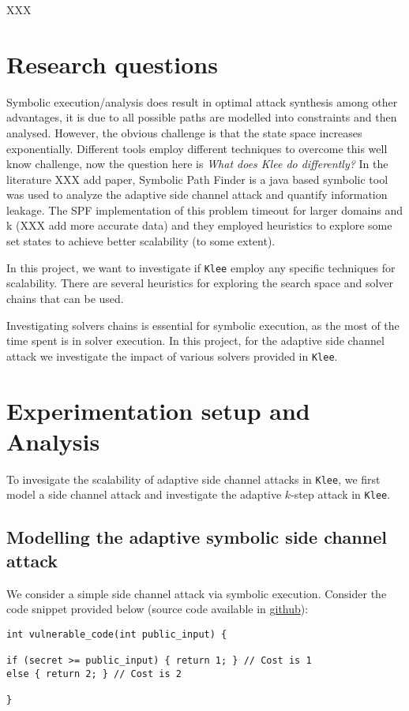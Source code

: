 \documentclass[11pt,a4paper,notitlepage]{article}
\begin{document}
XXX

\newpage

\section{Research questions}
\label{sec:researchquestions}

Symbolic execution/analysis does result in optimal attack synthesis among other advantages, it is due to all possible paths are modelled into constraints and then analysed.
However, the obvious challenge is that the state space increases exponentially.
Different tools employ different techniques to overcome this well know challenge, now the question here is \emph{What does Klee do differently?}
In the literature XXX add paper, Symbolic Path Finder is a java based symbolic tool was used to analyze the adaptive side channel attack and quantify information leakage.
The SPF implementation of this problem timeout for larger domains and k (XXX add more accurate data) and they employed heuristics to explore some set states to achieve better scalability (to some extent).

In this project, we want to investigate if \texttt{Klee} employ any specific techniques for scalability.
There are several heuristics for exploring the search space and solver chains that can be used.

Investigating solvers chains is essential for symbolic execution, as the most of the time spent is in solver execution.
In this project, for the adaptive side channel attack we investigate the impact of various solvers provided in \texttt{Klee}.

\newpage

\section{Experimentation setup and Analysis}
\label{sec:experimentationanddesign}

To invesigate the scalability of adaptive side channel attacks in \texttt{Klee}, we first model a side channel attack and investigate the adaptive $k$-step attack in \texttt{Klee}.

\subsection{Modelling the adaptive symbolic side channel attack}
\label{subsec:modellingsscattack}

We consider a simple side channel attack via symbolic execution.
Consider the code snippet provided below (source code available in \href{https://github.com/irfansha/LBS_projects.git}{github}):
\begin{verbatim}
int vulnerable_code(int public_input) {

if (secret >= public_input) { return 1; } // Cost is 1
else { return 2; } // Cost is 2

}
\end{verbatim}
\end{document}
